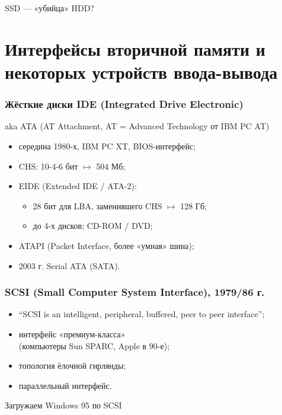 \begin{frame}{SSD — «убийца» HDD?}
\end{frame}

\section[Интерфейсы вторичной памяти и некоторых I/O-устройств]{Интерфейсы вторичной памяти и некоторых устройств ввода-вывода}

\begin{frame}
\frametitle{Жёсткие диски IDE (Integrated Drive Electronic)}
aka ATA (AT Attachment, AT = Advanced Technology от IBM PC AT)
\begin{itemize}[<+->]
    \item середина 1980-х, IBM PC XT, BIOS-интерфейс;
    \item CHS: 10-4-6 бит $\mapsto$ 504 Мб;
    \item EIDE (Extended IDE / ATA-2):
    \begin{itemize}
        \item 28 бит для LBA, заменившего CHS  $\mapsto$ 128 Гб;
        \item до 4-х дисков; CD-ROM / DVD;
    \end{itemize}
    \item ATAPI (Packet Interface, более «умная» шина);
    \item 2003 г. Serial ATA (SATA).
\end{itemize}
\end{frame}

\begin{frame}
\frametitle{SCSI (Small Computer System Interface), 1979/86 г.}
\begin{itemize}
    \item “SCSI is an intelligent, peripheral, buffered, peer to peer interface”;
    \item интерфейс «премиум-класса»\\(компьютеры Sun SPARC, Apple в 90-е);
    \item топология ёлочной гирлянды;
    \item параллельный интерфейс.
\end{itemize}
\end{frame}

\begin{frame}[plain]{Загружаем Windows 95 по SCSI}
\vspace{-.3cm}
\end{frame}

